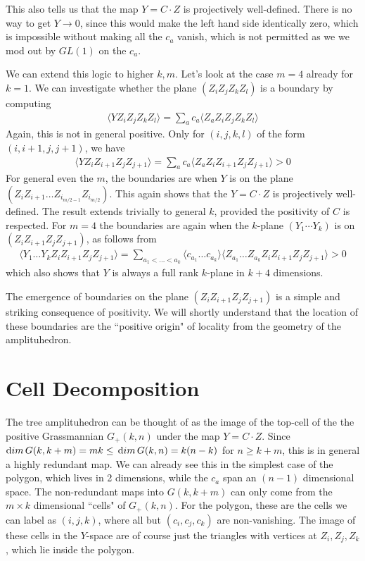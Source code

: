 \documentclass[12pt,nohyper,twosided]{JHEP3}
\newcommand{\be}{\begin{eqnarray}}
\newcommand{\ee}{\end{eqnarray}}
\begin{document}
This also tells us that the map  $Y = C \cdot Z$ is projectively well-defined.
There is no way to get $Y \to 0$, since this would make the left hand side
identically zero, which is impossible without making all the $c_a$
vanish, which is not permitted as we we mod out by
$GL(1)$ on the $c_a$.

We can extend this logic to higher $k,m$. Let's look at the case
$m=4$ already for $k=1$.
We can investigate whether the plane $(Z_i Z_j Z_k Z_l)$ is a boundary by computing
\be \langle Y Z_i Z_j Z_k Z_l \rangle = \sum_a c_a  \langle Z_a Z_i
Z_j Z_k Z_l \rangle \ee Again, this is not in general positive. Only for
$(i,j,k,l)$ of the form $(i,i+1,j, j+1)$, we have \be \langle Y Z_i
Z_{i+1} Z_j Z_{j+1} \rangle = \sum_a c_a  \langle Z_a Z_i Z_{ i+1}
Z_j Z_{j+1} \rangle > 0 \ee For general even the  $m$, the
boundaries are when $Y$ is on the plane\\ $(Z_{i} Z_{i+1}
\dots Z_{i_{m/2 - 1}} Z_{i_{m/2}})$. This again shows that the $Y =
C \cdot Z$ is projectively well-defined. The result extends
trivially to general $k$, provided the positivity of $C$ is
respected. For $m = 4$ the boundaries are again when the $k$-plane $(Y_1 \cdots Y_k)$ is on  $(Z_i Z_{i+1} Z_j
Z_{j+1})$, as follows from \be \langle Y_1 \dots Y_k Z_i Z_{i+1} Z_j
Z_{j+1} \rangle = \sum_{a_1< \dots < a_k} \langle c_{a_1} \dots
c_{a_k} \rangle  \langle Z_{a_1} \dots Z_{a_k} Z_i Z_{i+1} Z_j
Z_{j+1} \rangle > 0 \ee which also shows that $Y$ is always a full rank
$k$-plane in $k+4$ dimensions.

The emergence of boundaries on the plane $(Z_{i} Z_{i+1} Z_j
Z_{j+1})$ is a simple and striking consequence of positivity. We will
shortly understand that the location of these boundaries are the
``positive origin" of locality from the geometry of the
amplituhedron.

\section{Cell Decomposition}

The tree amplituhedron can be thought of as the image of the
top-cell of the the positive Grassmannian $G_+(k,n)$ under the map
$Y = C \cdot Z$. Since ${\rm dim}\, G(k,k+m) = m k \leq\,{\rm
dim}\,G(k,n)= k (n -k)$ for $n \geq k+m$, this is in general a
highly redundant map. We can already see this in the simplest case
of the polygon, which lives in 2 dimensions, while the $c_a$ span an
$(n-1)$ dimensional space. The non-redundant maps into $G(k,k+m)$
can only come from the $m \times k$ dimensional ``cells" of
$G_+(k,n)$. For the polygon, these are the cells we can label as
$(i,j,k)$, where all but $(c_i,c_j,c_k)$ are non-vanishing. The
image of these cells in the $Y$-space are of course just the
triangles with vertices at $Z_i,Z_j,Z_k$, which lie inside the
polygon.
\end{document}
